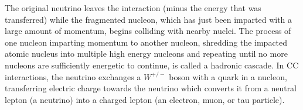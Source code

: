   \noindent The original neutrino leaves the interaction (minus the energy that was transferred) while the fragmented nucleon, which has just been imparted with a large amount of momentum, begins colliding with nearby nuclei. %
  The process of one nucleon imparting momentum to another nucleon, shredding the impacted atomic nucleus into multiple high energy nucleons and repeating until no more nucleons are sufficiently energetic to continue, is called a hadronic cascade.
  In CC interactions, the neutrino exchanges a $W^{+/-}$ boson with a quark in a nucleon, transferring electric charge towards the neutrino which converts it from a neutral lepton (a neutrino) into a charged lepton (an electron, muon, or tau particle). 
  \begin{center}
  \end{center}

